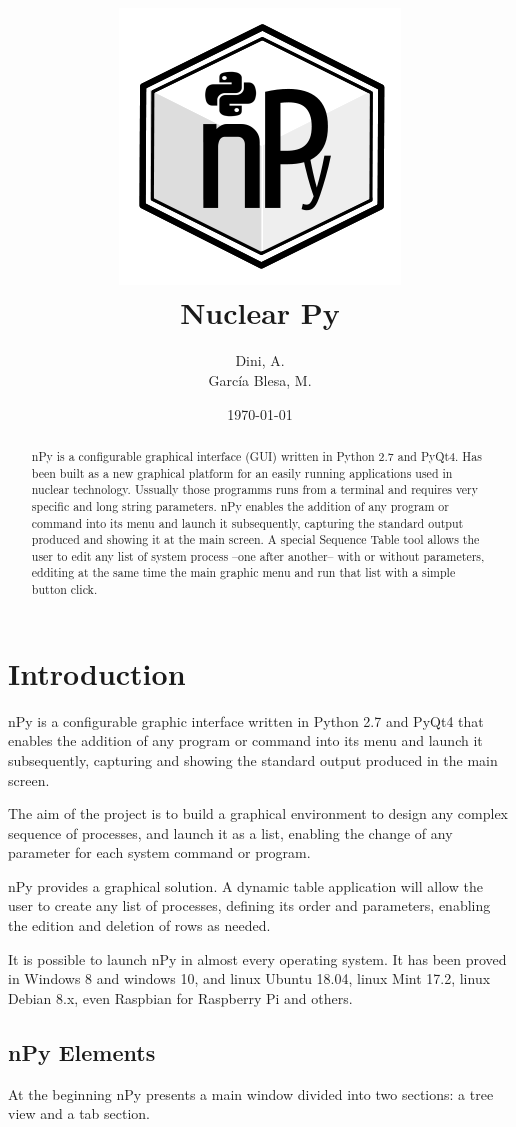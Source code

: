 \documentclass[a4paper,10pt]{article}
\author{Dini, A. \\García Blesa, M.}%
\date{\today}%
\title{\includegraphics[scale=0.5]{img/nPyLogo.png}\\\textbf{Nuclear Py}}%
\begin{document}
\maketitle

\begin{abstract}
nPy is a configurable graphical interface (GUI) written in Python 2.7 and PyQt4. Has been built as a new graphical platform for an easily running applications used in nuclear technology. Ussually those programms runs from a terminal and requires very specific and long string parameters. nPy enables the addition of any program or command into its menu and launch it subsequently, capturing the standard output produced and showing it at the main screen. A special Sequence Table tool allows the user to edit any list of system process --one after another-- with or without parameters, edditing at the same time the main graphic menu and run that list with a simple button click.
\end{abstract}
\newpage

\tableofcontents
\newpage

\section{Introduction}
nPy is a configurable graphic interface written in Python 2.7 and PyQt4 that enables the addition of any program or command into its menu and launch it subsequently, capturing and showing the standard output produced in the main screen.

The aim of the project is to build a graphical environment to design any complex sequence of processes, and launch it as a list, enabling the change of any parameter for each system command or program.

nPy provides a graphical solution. A dynamic table application will allow the user to create any list of processes, defining its order and parameters, enabling the edition and deletion of rows as needed.

It is possible to launch nPy in almost every operating system. It has been proved in Windows 8 and windows 10, and linux Ubuntu 18.04, linux Mint 17.2, linux Debian 8.x, even Raspbian for Raspberry Pi and others.

\subsection{nPy Elements}

At the beginning nPy presents a main window divided into two sections: a tree view and a tab section.
\end{document}
